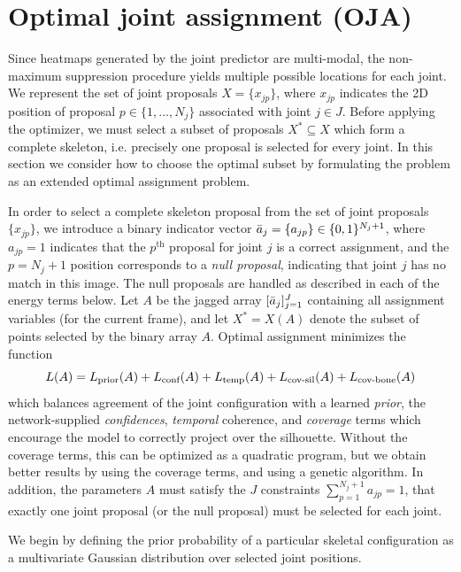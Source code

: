 \section{Optimal joint assignment (OJA)}
\label{sec:qp}
Since heatmaps generated by the joint predictor are multi-modal, the non-maximum suppression procedure yields multiple possible locations for each joint. We represent the set of joint proposals $X = \{x_{jp}\}$, where $x_{jp}$ indicates the 2D position of proposal $p \in \{1,...,N_j\}$ associated with joint $j \in J$.
Before applying the optimizer, we must select a subset of proposals $X^* \subseteq X$ which form a complete skeleton, i.e. precisely one proposal is selected for every joint. In this section we consider how to choose the optimal subset by formulating the problem as an extended optimal assignment problem.

In order to select a complete skeleton proposal from the set of joint proposals $\{x_{jp}\}$, we introduce a binary indicator vector $\bar{a}_j = \{a_{jp}\} \in \{0, 1\}^{N_j+1}$, where $a_{jp} = 1$ indicates that the $p^\text{th}$ proposal for joint $j$ is a correct assignment, and the $p = N_j+1$ position corresponds to a {\em null proposal}, indicating that joint $j$ has no match in this image.
The null proposals are handled as described in each of the energy terms below.
Let $A$ be the jagged array $[\bar{a}_j]_{j=1}^J$ containing all assignment variables (for the current frame), and let $X^* = X(A)$ denote the subset of points selected by the binary array $A$.   
Optimal assignment minimizes the function
\begin{equation}
L(A) = L_{\text{prior}}(A) + L_{\text{conf}}(A) + L_{\text{temp}}(A) + L_{\text{cov-sil}}(A) + L_{\text{cov-bone}}(A)
\end{equation}
which balances agreement of the joint configuration with a learned {\em prior}, the network-supplied {\em confidences}, {\em temporal} coherence, and {\em coverage} terms which encourage the  model to correctly project over the silhouette.   Without the coverage terms, this can be optimized as a quadratic program, but we obtain better results by using the coverage terms, and using a genetic algorithm.  In addition, the parameters $A$ must satisfy the $J$ constraints $\sum_{p=1}^{N_j+1} a_{jp} = 1$, that exactly one joint proposal (or the null proposal) must be selected for each joint.


 We begin by defining the prior probability of a particular skeletal configuration as a multivariate Gaussian distribution over selected joint positions.

